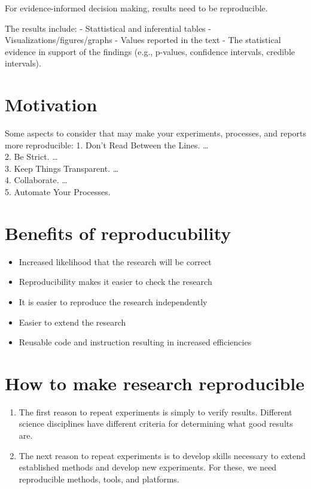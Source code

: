 \documentclass[
]{book}
\providecommand{\tightlist}{%
  \setlength{\itemsep}{0pt}\setlength{\parskip}{0pt}}
\begin{document}
For evidence-informed decision making, results need to be reproducible.

The results include:
- Stattistical and inferential tables
- Visualizations/figures/graphs
- Values reported in the text
- The statistical evidence in support of the findings (e.g., p-values, confidence intervals, credible intervals).

\hypertarget{motivation}{%
\section{Motivation}\label{motivation}}

Some aspects to consider that may make your experiments, processes, and reports more reproducible:
1. Don't Read Between the Lines. \ldots{}\\
2. Be Strict. \ldots{}\\
3. Keep Things Transparent. \ldots{}\\
4. Collaborate. \ldots{}\\
5. Automate Your Processes.

\hypertarget{benefits-of-reproducubility}{%
\section{Benefits of reproducubility}\label{benefits-of-reproducubility}}

\begin{itemize}
\tightlist
\item
  Increased likelihood that the research will be correct
\item
  Reproducibility makes it easier to check the research
\item
  It is easier to reproduce the research independently
\item
  Easier to extend the research
\item
  Reusable code and instruction resulting in increased efficiencies
\end{itemize}

\hypertarget{how-to-make-research-reproducible}{%
\section{How to make research reproducible}\label{how-to-make-research-reproducible}}

\begin{enumerate}
\def\labelenumi{\arabic{enumi})}
\tightlist
\item
  The first reason to repeat experiments is simply to verify results. Different science disciplines have different criteria for determining what good results are.
\item
  The next reason to repeat experiments is to develop skills necessary to extend established methods and develop new experiments. For these, we need reproducible methods, tools, and platforms.
\end{enumerate}
\end{document}
